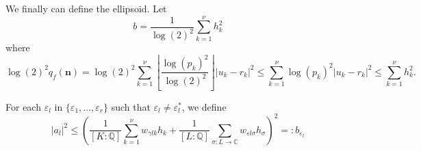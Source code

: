 %

We finally can define the ellipsoid. Let
\[b = \frac{1}{\log(2)^2}\sum_{k = 1}^{\nu} h_k^2\]
where
\[\log(2)^2q_f(\mathbf{n}) = \log(2)^2\sum_{k = 1}^{\nu}\left\lfloor\frac{\log(p_k)^2}{\log(2)^2}\right\rfloor|u_k-r_k|^2 \leq \sum_{k = 1}^{\nu} \log(p_k)^2|u_k -r_k|^2 \leq \sum_{k = 1}^{\nu} h_k^2.\]


For each $\varepsilon_l$ in $\{\varepsilon_1, \dots, \varepsilon_r\}$ such that $\varepsilon_l \neq \varepsilon_l^*$, we define
\[|a_l|^2 \leq \left( \frac{1}{[K:\mathbb{Q}]}\sum_{k = 1}^{\nu} w_{\gamma l k}h_k + \frac{1}{[L:\mathbb{Q}]}\sum_{\sigma:L\to \mathbb{C}} w_{\varepsilon l \sigma}h_{\sigma}\right)^2=:b_{\varepsilon_l} \]

